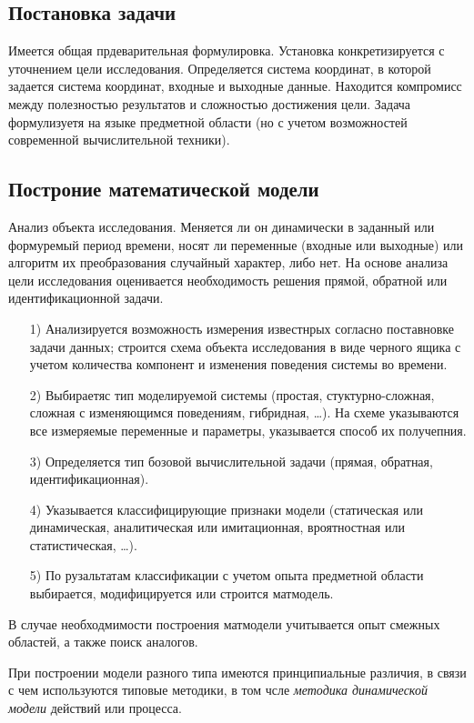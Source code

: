 \documentclass[12pt]{article}
\begin{document}
\subsection{Постановка задачи}
Имеется общая прдеварительная формулировка. Установка конкретизируется с уточнением цели исследования. Определяется система координат, в которой задается система координат, входные и выходные данные. Находится компромисс между полезностью результатов и сложностью достижения цели. Задача формулизуетя на языке предметной области (но с учетом возможностей современной вычислительной техники).

\subsection{Построние математической модели}
Анализ объекта исследования. Меняется ли он динамически в заданный или формуремый период времени, носят ли переменные (входные или выходные) или алгоритм их преобразования случайный характер, либо нет. На основе анализа цели исследования оценивается необходимость решения прямой, обратной или идентификационной задачи.

\begin{enumerate}
    \item[1)] Анализируется возможность измерения известнрых согласно поставновке задачи данных; строится схема объекта исследования в виде черного ящика с учетом количества компонент и изменения поведения системы во времени.
    \item[2)] Выбираетяс тип моделируемой системы (простая, стуктурно-сложная, сложная с изменяющимся поведениям, гибридная, \ldots). На схеме указываются все измеряемые переменные и параметры, указывается способ их получепния.
    \item[3)] Определяется тип бозовой вычислительной задачи (прямая, обратная, идентификационная).
    \item[4)] Указывается классифицирующие признаки модели (статическая или динамическая, аналитическая или имитационная, вроятностная или статистическая, \ldots). 
    \item[5)] По рузальтатам классификации с учетом опыта предметной области выбирается, модифицируется или строится матмодель.
\end{enumerate}

В случае необходмимости построения матмодели учитывается опыт смежных областей, а также поиск аналогов.

При построении модели разного типа имеются принципиальные различия, в связи с чем используются типовые методики, в том чсле \emph{методика динамической модели} действий или процесса.\\
\end{document}
